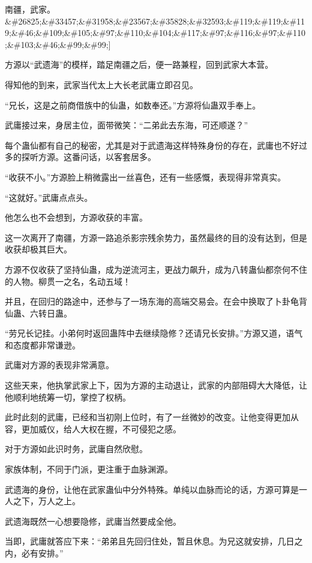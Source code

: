 
\begin{this_body}

南疆，武家。\&\#26825;\&\#33457;\&\#31958;\&\#23567;\&\#35828;\&\#32593;\&\#119;\&\#119;\&\#119;\&\#46;\&\#109;\&\#105;\&\#97;\&\#110;\&\#104;\&\#117;\&\#97;\&\#116;\&\#97;\&\#110;\&\#103;\&\#46;\&\#99;\&\#99;]

方源以“武遗海”的模样，踏足南疆之后，便一路兼程，回到武家大本营。

得知他的到来，武家当代太上大长老武庸立即召见。

“兄长，这是之前商借族中的仙蛊，如数奉还。”方源将仙蛊双手奉上。

武庸接过来，身居主位，面带微笑：“二弟此去东海，可还顺遂？”

每个蛊仙都有自己的秘密，尤其是对于武遗海这样特殊身份的存在，武庸也不好过多的探听方源。这番问话，以客套居多。

“收获不小。”方源脸上稍微露出一丝喜色，还有一些感慨，表现得非常真实。

“这就好。”武庸点点头。

他怎么也不会想到，方源收获的丰富。

这一次离开了南疆，方源一路追杀影宗残余势力，虽然最终的目的没有达到，但是收获却极其巨大。

方源不仅收获了坚持仙蛊，成为逆流河主，更战力飙升，成为八转蛊仙都奈何不住的人物。柳贯一之名，名动五域！

并且，在回归的路途中，还参与了一场东海的高端交易会。在会中换取了卜卦龟背仙蛊、六转日蛊。

“劳兄长记挂。小弟何时返回蛊阵中去继续隐修？还请兄长安排。”方源又道，语气和态度都非常谦逊。

武庸对方源的表现非常满意。

这些天来，他执掌武家上下，因为方源的主动退让，武家的内部阻碍大大降低，让他顺利地统筹一切，掌控了权柄。

此时此刻的武庸，已经和当初刚上位时，有了一丝微妙的改变。让他变得更加从容，更加威仪，给人大权在握，不可侵犯之感。

对于方源如此识时务，武庸自然欣慰。

家族体制，不同于门派，更注重于血脉渊源。

武遗海的身份，让他在武家蛊仙中分外特殊。单纯以血脉而论的话，方源可算是一人之下，万人之上。

武遗海既然一心想要隐修，武庸当然要成全他。

当即，武庸就答应下来：“弟弟且先回归住处，暂且休息。为兄这就安排，几日之内，必有安排。”


\end{this_body}

